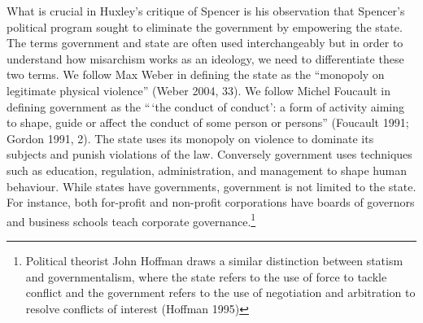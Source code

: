 \documentclass[12pt,]{article}
\let\rmarkdownfootnote\footnote%
\def\footnote{\protect\rmarkdownfootnote}
\begin{document}
What is crucial in Huxley's critique of Spencer is his observation that
Spencer's political program sought to eliminate the government by
empowering the state. The terms government and state are often used
interchangeably but in order to understand how misarchism works as an
ideology, we need to differentiate these two terms. We follow Max Weber
in defining the state as the ``monopoly on legitimate physical
violence'' (Weber 2004, 33). We follow Michel Foucault in defining
government as the ``\,`the conduct of conduct': a form of activity
aiming to shape, guide or affect the conduct of some person or persons''
(Foucault 1991; Gordon 1991, 2). The state uses its monopoly on violence
to dominate its subjects and punish violations of the law. Conversely
government uses techniques such as education, regulation,
administration, and management to shape human behaviour. While states
have governments, government is not limited to the state. For instance,
both for-profit and non-profit corporations have boards of governors and
business schools teach corporate governance.\footnote{Political theorist
  John Hoffman draws a similar distinction between statism and
  governmentalism, where the state refers to the use of force to tackle
  conflict and the government refers to the use of negotiation and
  arbitration to resolve conflicts of interest (Hoffman 1995)}
\end{document}
